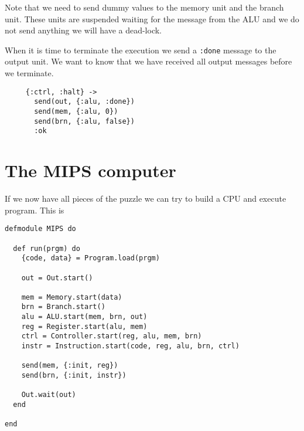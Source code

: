 \documentclass[a4paper,11pt]{article}
\begin{document}
Note that we need to send dummy values to the memory unit and the
branch unit. These units are suspended waiting for the message from the
ALU and we do not send anything we will have a dead-lock.


When it is time to terminate the execution we send a {\tt :done}
message to the output unit. We want to know that we have received all
output messages before we terminate.

\begin{verbatim}
     {:ctrl, :halt} ->
       send(out, {:alu, :done})
       send(mem, {:alu, 0})		
       send(brn, {:alu, false})
       :ok
\end{verbatim}

\section*{The MIPS computer}

If we now have all pieces of the puzzle we can try to build a CPU and execute program. This is


\begin{verbatim}
defmodule MIPS do

  def run(prgm) do
    {code, data} = Program.load(prgm)

    out = Out.start()

    mem = Memory.start(data)
    brn = Branch.start()
    alu = ALU.start(mem, brn, out)
    reg = Register.start(alu, mem)
    ctrl = Controller.start(reg, alu, mem, brn)
    instr = Instruction.start(code, reg, alu, brn, ctrl)

    send(mem, {:init, reg})
    send(brn, {:init, instr})

    Out.wait(out)
  end

end
\end{verbatim}
\end{document}
